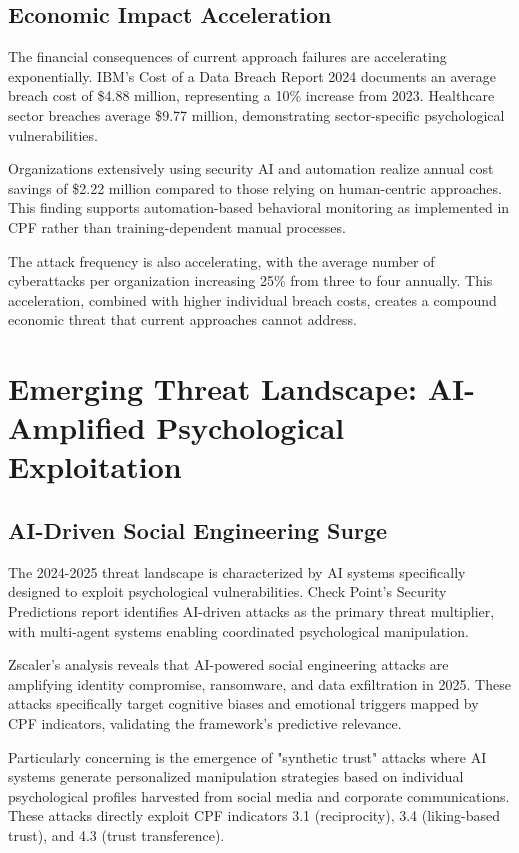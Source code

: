 \documentclass[11pt,a4paper]{article}
\begin{document}
\subsection{Economic Impact Acceleration}

The financial consequences of current approach failures are accelerating exponentially. IBM's Cost of a Data Breach Report 2024 documents an average breach cost of \$4.88 million, representing a 10\% increase from 2023\cite{ibm2024}. Healthcare sector breaches average \$9.77 million, demonstrating sector-specific psychological vulnerabilities.

Organizations extensively using security AI and automation realize annual cost savings of \$2.22 million compared to those relying on human-centric approaches\cite{ibm2024}. This finding supports automation-based behavioral monitoring as implemented in CPF rather than training-dependent manual processes.

The attack frequency is also accelerating, with the average number of cyberattacks per organization increasing 25\% from three to four annually\cite{sentinelone2024}. This acceleration, combined with higher individual breach costs, creates a compound economic threat that current approaches cannot address.

\section{Emerging Threat Landscape: AI-Amplified Psychological Exploitation}

\subsection{AI-Driven Social Engineering Surge}

The 2024-2025 threat landscape is characterized by AI systems specifically designed to exploit psychological vulnerabilities. Check Point's Security Predictions report identifies AI-driven attacks as the primary threat multiplier, with multi-agent systems enabling coordinated psychological manipulation\cite{checkpoint2024}.

Zscaler's analysis reveals that AI-powered social engineering attacks are amplifying identity compromise, ransomware, and data exfiltration in 2025\cite{zscaler2024}. These attacks specifically target cognitive biases and emotional triggers mapped by CPF indicators, validating the framework's predictive relevance.

Particularly concerning is the emergence of "synthetic trust" attacks where AI systems generate personalized manipulation strategies based on individual psychological profiles harvested from social media and corporate communications. These attacks directly exploit CPF indicators 3.1 (reciprocity), 3.4 (liking-based trust), and 4.3 (trust transference).
\end{document}
